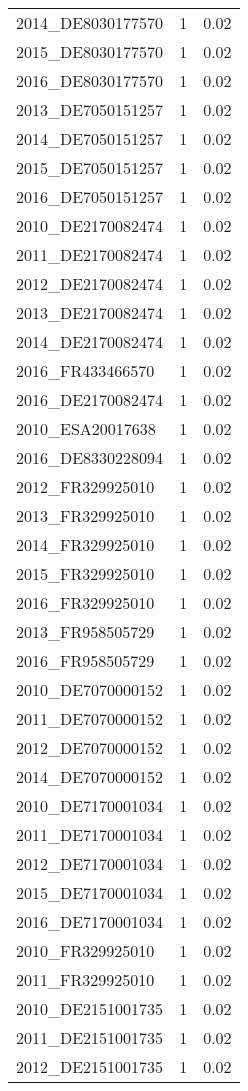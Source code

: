 \begin{table*}[htbp]
\begin{tabular}{lrr}
2014_DE8030177570 & 1 & 0.02 \\
2015_DE8030177570 & 1 & 0.02 \\
2016_DE8030177570 & 1 & 0.02 \\
2013_DE7050151257 & 1 & 0.02 \\
2014_DE7050151257 & 1 & 0.02 \\
2015_DE7050151257 & 1 & 0.02 \\
2016_DE7050151257 & 1 & 0.02 \\
2010_DE2170082474 & 1 & 0.02 \\
2011_DE2170082474 & 1 & 0.02 \\
2012_DE2170082474 & 1 & 0.02 \\
2013_DE2170082474 & 1 & 0.02 \\
2014_DE2170082474 & 1 & 0.02 \\
2016_FR433466570 & 1 & 0.02 \\
2016_DE2170082474 & 1 & 0.02 \\
2010_ESA20017638 & 1 & 0.02 \\
2016_DE8330228094 & 1 & 0.02 \\
2012_FR329925010 & 1 & 0.02 \\
2013_FR329925010 & 1 & 0.02 \\
2014_FR329925010 & 1 & 0.02 \\
2015_FR329925010 & 1 & 0.02 \\
2016_FR329925010 & 1 & 0.02 \\
2013_FR958505729 & 1 & 0.02 \\
2016_FR958505729 & 1 & 0.02 \\
2010_DE7070000152 & 1 & 0.02 \\
2011_DE7070000152 & 1 & 0.02 \\
2012_DE7070000152 & 1 & 0.02 \\
2014_DE7070000152 & 1 & 0.02 \\
2010_DE7170001034 & 1 & 0.02 \\
2011_DE7170001034 & 1 & 0.02 \\
2012_DE7170001034 & 1 & 0.02 \\
2015_DE7170001034 & 1 & 0.02 \\
2016_DE7170001034 & 1 & 0.02 \\
2010_FR329925010 & 1 & 0.02 \\
2011_FR329925010 & 1 & 0.02 \\
2010_DE2151001735 & 1 & 0.02 \\
2011_DE2151001735 & 1 & 0.02 \\
2012_DE2151001735 & 1 & 0.02 \\

\end{tabular}
\end{table*}

